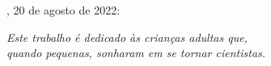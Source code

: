 
%
% 
%
\begin{folhadeaprovacao}

  \begin{center}
    {\ABNTEXchapterfont\large\MakeUppercase{\imprimirautor}}

    \vspace*{\fill}\vspace*{\fill}
    \begin{center}
      \ABNTEXchapterfont\bfseries\Large\MakeUppercase{\imprimirtitulo}
    \end{center}
    \vspace*{\fill}
    
    \imprimirtextoaprovacao
     
    \vspace*{1cm}
    
	\imprimirlocal, 20 de agosto de 2022:

    \vspace*{\fill}

   \end{center}
        


      
    \vspace*{1cm}  
  
\end{folhadeaprovacao}

\begin{dedicatoria}
   \vspace*{\fill}
   \begin{flushright}
   \noindent
   \textit{ Este trabalho é dedicado às crianças adultas que,\\
   quando pequenas, sonharam em se tornar cientistas.}\vspace*{2cm}
   \end{flushright}
\end{dedicatoria}

